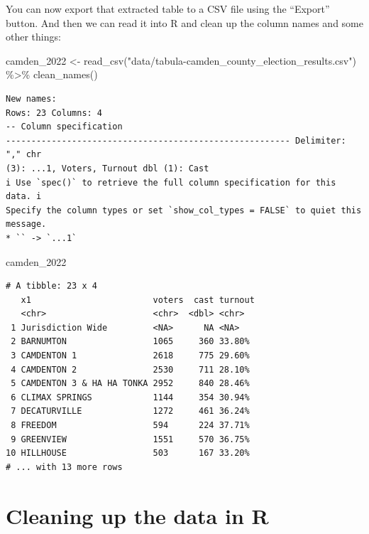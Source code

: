 \documentclass[
  letterpaper,
  DIV=11,
  numbers=noendperiod]{scrreprt}
\newenvironment{Shaded}{\begin{snugshade}}{\end{snugshade}}
\newcommand{\FunctionTok}[1]{\textcolor[rgb]{0.28,0.35,0.67}{#1}}
\newcommand{\NormalTok}[1]{\textcolor[rgb]{0.00,0.23,0.31}{#1}}
\newcommand{\OtherTok}[1]{\textcolor[rgb]{0.00,0.23,0.31}{#1}}
\newcommand{\SpecialCharTok}[1]{\textcolor[rgb]{0.37,0.37,0.37}{#1}}
\newcommand{\StringTok}[1]{\textcolor[rgb]{0.13,0.47,0.30}{#1}}
\begin{document}
You can now export that extracted table to a CSV file using the
``Export'' button. And then we can read it into R and clean up the
column names and some other things:

\begin{Shaded}
\begin{Highlighting}[]
\NormalTok{camden\_2022 }\OtherTok{\textless{}{-}} \FunctionTok{read\_csv}\NormalTok{(}\StringTok{"data/tabula{-}camden\_county\_election\_results.csv"}\NormalTok{) }\SpecialCharTok{\%\textgreater{}\%} \FunctionTok{clean\_names}\NormalTok{()}
\end{Highlighting}
\end{Shaded}

\begin{verbatim}
New names:
Rows: 23 Columns: 4
-- Column specification
-------------------------------------------------------- Delimiter: "," chr
(3): ...1, Voters, Turnout dbl (1): Cast
i Use `spec()` to retrieve the full column specification for this data. i
Specify the column types or set `show_col_types = FALSE` to quiet this message.
* `` -> `...1`
\end{verbatim}

\begin{Shaded}
\begin{Highlighting}[]
\NormalTok{camden\_2022}
\end{Highlighting}
\end{Shaded}

\begin{verbatim}
# A tibble: 23 x 4
   x1                        voters  cast turnout
   <chr>                     <chr>  <dbl> <chr>  
 1 Jurisdiction Wide         <NA>      NA <NA>   
 2 BARNUMTON                 1065     360 33.80% 
 3 CAMDENTON 1               2618     775 29.60% 
 4 CAMDENTON 2               2530     711 28.10% 
 5 CAMDENTON 3 & HA HA TONKA 2952     840 28.46% 
 6 CLIMAX SPRINGS            1144     354 30.94% 
 7 DECATURVILLE              1272     461 36.24% 
 8 FREEDOM                   594      224 37.71% 
 9 GREENVIEW                 1551     570 36.75% 
10 HILLHOUSE                 503      167 33.20% 
# ... with 13 more rows
\end{verbatim}

\hypertarget{cleaning-up-the-data-in-r}{%
\section{Cleaning up the data in R}\label{cleaning-up-the-data-in-r}}
\end{document}
